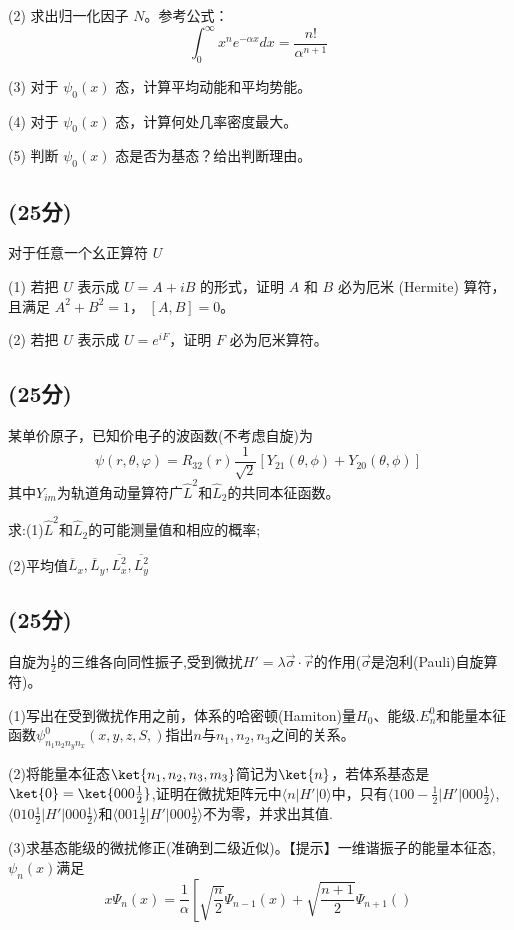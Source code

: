 (2) 求出归一化因子 $N$。参考公式：
\[\int_0^\infty x^n e^{- \alpha x} dx = \frac{n!}{\alpha^{n+1}}~\]

(3) 对于 $\psi_0(x)$ 态，计算平均动能和平均势能。

(4) 对于 $\psi_0(x)$ 态，计算何处几率密度最大。

(5) 判断 $\psi_0(x)$ 态是否为基态？给出判断理由。
\subsection{(25分)}
对于任意一个幺正算符 \( U \)

(1) 若把 \( U \) 表示成 \( U = A + iB \) 的形式，证明 \( A \) 和 \( B \) 必为厄米 (Hermite) 算符，且满足 \( A^2 + B^2 = 1 \)， \([A, B] = 0 \)。

(2) 若把 \( U \) 表示成 \( U = e^{iF} \)，证明 \( F \) 必为厄米算符。
\subsection{(25分)}
某单价原子，已知价电子的波函数(不考虑自旋)为
$$\psi(r,\theta,\varphi)=R_{32}(r)\frac{1}{\sqrt{2}}[Y_{21}(\theta,\phi)+Y_{20}(\theta,\phi)]~$$
其中$Y_{im}$为轨道角动量算符广$\hat{L}^2$和$\hat{L}_2$的共同本征函数。

求:(1)$\hat{L}^2$和$\hat{L}_2$的可能测量值和相应的概率;

(2)平均值$\overline{L}_x,\overline{L}_y,\overline{L^2_x},\overline{L^2_y}$
\subsection{(25分)}
自旋为$\frac{1}{2}$的三维各向同性振子,受到微扰$H'=\lambda \vec{\sigma}\cdot \vec{r}$的作用($\vec{\sigma}$是泡利(Pauli)自旋算符)。

(1)写出在受到微扰作用之前，体系的哈密顿(Hamiton)量$H_0$、能级.$E^0_n$和能量本征函数$\psi^0_{n_1n_2n_yn_x}(x,y,z,S,)$指出$n$与$n_1,n_2,n_3$之间的关系。

(2)将能量本征态$\ket{n_1,n_2,n_3,m_3}$简记为$\ket{n}$，若体系基态是$\ket{0}=\ket{000\frac{1}{2}}$,证明在微扰矩阵元中$\langle n | H' | 0 \rangle$中，只有$\langle 100-\frac{1}{2} | H' | 000\frac{1}{2} \rangle$,$\langle 010\frac{1}{2} | H' | 000\frac{1}{2} \rangle$和$\langle 001\frac{1}{2} | H' | 000\frac{1}{2} \rangle$不为零，并求出其值.

(3)求基态能级的微扰修正(准确到二级近似)。【提示】一维谐振子的能量本征态,$\psi_n(x)$满足
$$x\Psi_n(x)=\frac{1}{\alpha}\left[\sqrt{\frac{n}{2}}\Psi_{n-1}(x)+\sqrt{\frac{n+1}{2}}\Psi_{n+1}()~$$